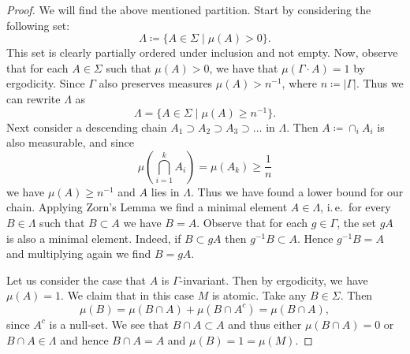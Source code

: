 \begin{proof}
  We will find the above mentioned partition. Start by considering the following set:
  \[
    \Lambda \coloneqq \{A \in \Sigma \mid \mu(A) > 0\}.
  \]
  This set is clearly partially ordered under inclusion and not empty. Now, observe that for each \(A \in \Sigma\) such that \(\mu(A) > 0\), we have that \(\mu(\Gamma \cdot A) = 1\) by ergodicity. Since \(\Gamma\) also preserves measures \(\mu(A) > n^{-1}\), where \(n \coloneqq |\Gamma|\). Thus we can rewrite \(\Lambda\) as
  \[
    \Lambda = \{A \in \Sigma \mid \mu(A) \geq n^{-1}\}.
  \]
  Next consider a descending chain \(A_1 \supset A_2 \supset A_3 \supset \dots\) in \(\Lambda\). Then \(A \coloneqq \cap_i A_i\) is also measurable, and since
  \[
    \mu\left(\bigcap_{i=1}^k A_i \right) = \mu(A_k) \geq \frac1n
  \]
  we have \(\mu(A) \geq n^{-1}\) and \(A\) lies in \(\Lambda\). Thus we have found a lower bound for our chain. Applying Zorn's Lemma we find a minimal element \(A \in \Lambda\), i.\,e.\ for every \(B \in \Lambda\) such that \(B \subset A\) we have \(B = A\). Observe that for each \(g \in \Gamma\), the set \(gA\) is also a minimal element. Indeed, if \(B \subset gA\) then \(g^{-1} B \subset A\). Hence \(g^{-1}B = A\) and multiplying again we find \(B = gA\).

  Let us consider the case that \(A\) is \(\Gamma\)-invariant. Then by ergodicity, we have \(\mu(A) = 1\). We claim that in this case \(M\) is atomic. Take any \(B \in \Sigma\).
  Then
  \[
    \mu(B) = \mu(B \cap A) + \mu(B \cap A^c) = \mu(B \cap A),
  \]
  since \(A^c\) is a null-set. We see that \(B \cap A \subset A\) and thus either \(\mu(B \cap A) = 0\) or \(B  \cap A \in \Lambda\) and hence \(B \cap A = A\) and \(\mu(B) = 1 = \mu(M)\).


\end{proof}
